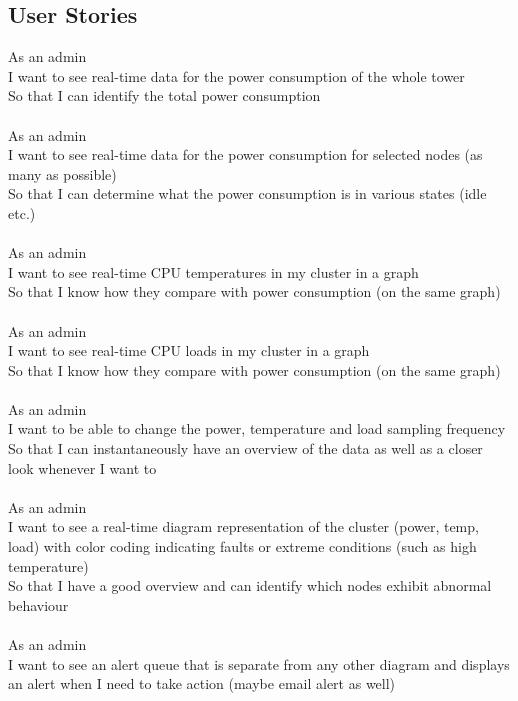 \documentclass{l4proj}
\begin{document}
\begin{appendices}
\chapter{User Stories}
\label{app_user_stories}
\noindent
As an admin \\
I want to see real-time data for the power consumption of the whole tower\\
So that I can identify the total power consumption\\\\
\noindent
As an admin\\
I want to see real-time data for the power consumption for selected nodes (as many as possible)\\
So that I can determine what the power consumption is in various states (idle etc.)\\\\
\noindent
As an admin\\
I want to see real-time CPU temperatures in my cluster in a graph\\
So that I know how they compare with power consumption (on the same graph)\\\\
\noindent
As an admin \\
I want to see real-time CPU loads in my cluster in a graph\\
So that I know how they compare with power consumption (on the same graph)\\\\
\noindent
As an admin\\
I want to be able to change the power, temperature and load sampling frequency\\
So that I can instantaneously have an overview of the data as well as a closer look whenever I want to\\\\
\noindent
As an admin\\
I want to see a real-time diagram representation of the cluster (power, temp, load) with color coding indicating faults or extreme conditions (such as high temperature)\\
So that I have a good overview and can identify which nodes exhibit abnormal behaviour\\\\
\noindent
As an admin\\
I want to see an alert queue that is separate from any other diagram and displays an alert when I need to take action (maybe email alert as well)\\

\end{appendices}
\end{document}
